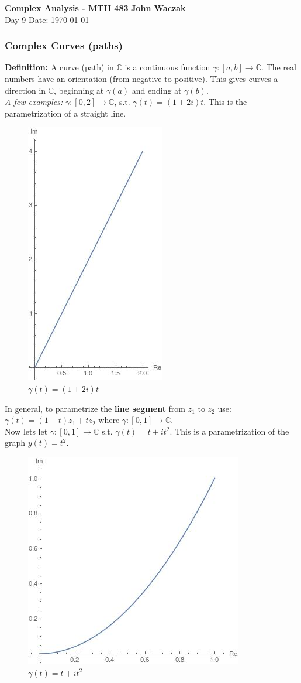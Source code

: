 \documentclass[a4paper, 11pt]{article}
\begin{document}
\noindent
\large\textbf{Complex Analysis - MTH 483} \hfill \textbf{John Waczak} \\
\normalsize Day 9 \hfill  Date: \today \\

\subsubsection*{Complex Curves (paths)} 
\textbf{Definition:} A curve (path) in $\mathbb{C}$ is a continuous function $\gamma:[a,b]\rightarrow \mathbb{C}$. The real numbers have an orientation (from negative to positive). This gives curves a direction in $\mathbb{C}$, beginning at $\gamma(a)$ and ending at $\gamma(b)$. \\ 

\noindent\textit{A few examples:} $\gamma:[0,2]\rightarrow \mathbb{C}$, s.t. $\gamma(t) = (1+2i)t$. This is the parametrization of a straight line. \\
	\begin{figure}[!hbt]
		\centering
		\includegraphics[width=0.35\columnwidth]{straightLine}
		\caption{$\gamma(t) = (1+2i)t$}
	\end{figure}

\noindent In general, to parametrize the \textbf{line segment} from $z_1$ to $z_2$ use: $\gamma(t) = (1-t)z_1 + tz_2$ where $\gamma:[0,1]\rightarrow\mathbb{C}$. \\


\noindent Now lets let $\gamma:[0,1]\rightarrow\mathbb{C}$ s.t. $\gamma(t) = t +it^2$. This is a parametrization of the graph $y(t) = t^2$. \\
	\begin{figure}[!hbt]
		\centering
		\includegraphics[width=0.35\columnwidth]{parametricParabola}
		\caption{$\gamma(t)=t+it^2$}
	\end{figure}
\pagebreak 
\end{document}
